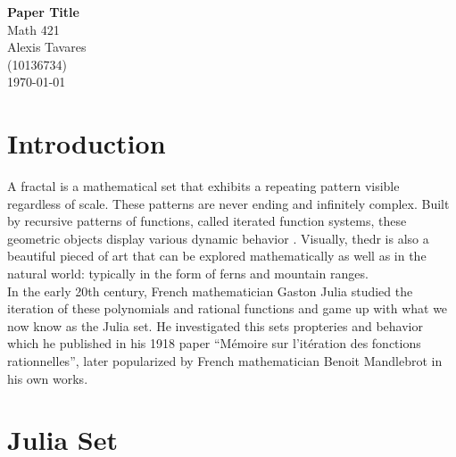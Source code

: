 \documentclass[12pt]{article}
\begin{document}
\begin{titlepage}
\vfill
\centering
{\Huge \bfseries Paper Title}\\[0.4cm]
{\Huge Math 421}\\[1cm]
{\Large Alexis Tavares}\\[0.5cm]
{\Large (10136734)}\\[1cm]
\today
\vfill
\end{titlepage}

\tableofcontents
\newpage
\section{Introduction}
{\parindent0pt
A fractal is a mathematical set that exhibits a repeating pattern visible regardless of scale. These patterns are never ending and infinitely complex. Built by recursive patterns of functions, called iterated function systems, these geometric objects display various dynamic behavior . Visually, thedr is also a beautiful pieced of art that can be explored mathematically as well as in the natural world: typically in the form of ferns and mountain ranges. \\

In the early 20th century, French mathematician Gaston Julia studied the iteration of these polynomials and rational functions and game up with what we now know as the Julia set. He investigated this sets propteries and behavior which he published in his 1918 paper “Mémoire sur l'itération des fonctions rationnelles”,  later popularized by French mathematician Benoit Mandlebrot in his own works. 
}
\section{Julia Set}
\end{document}
